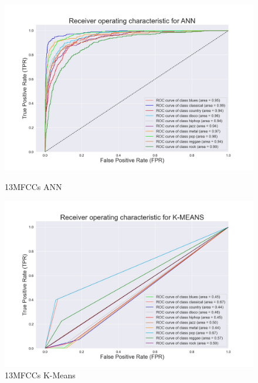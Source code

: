 \documentclass[conference]{IEEEtran}
\begin{document}
\begin{figure}[!ht]
\begin{center}
\begin{minipage}[t]{.24\textwidth}
        \end{minipage}
        \begin{minipage}[t]{.24\textwidth}
            \centering
            \includegraphics[width=\textwidth]{plot/SL/all_features/13/ANN_13MFCC_10000_10GEN_GTZAN - ROC Plot.jpg}
            \caption{13MFCCs ANN}
            \label{fig:13MFCCs ANN Time+frequency Features}
        \end{minipage}
        \begin{minipage}[t]{.24\textwidth}
            \centering
            \includegraphics[width=\textwidth]{plot/UL/all_features/13/13MFCC_10000_10GEN_GTZAN - ROC Plot.jpg}
            \caption{13MFCCs K-Means}
            \label{fig:13MFCCs K-Means Time+frequency Features}
        \end{minipage}
    \end{center}
\end{figure}
\end{document}
